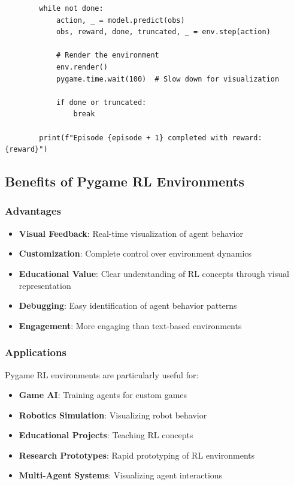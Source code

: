 \documentclass[12pt]{article}
\begin{document}
{{{\begin{verbatim}
        while not done:
            action, _ = model.predict(obs)
            obs, reward, done, truncated, _ = env.step(action)
            
            # Render the environment
            env.render()
            pygame.time.wait(100)  # Slow down for visualization
            
            if done or truncated:
                break
                
        print(f"Episode {episode + 1} completed with reward: {reward}")
\end{verbatim}

\subsection{Benefits of Pygame RL Environments}

\subsubsection{Advantages}

\begin{itemize}
    \item \textbf{Visual Feedback}: Real-time visualization of agent behavior
    \item \textbf{Customization}: Complete control over environment dynamics
    \item \textbf{Educational Value}: Clear understanding of RL concepts through visual representation
    \item \textbf{Debugging}: Easy identification of agent behavior patterns
    \item \textbf{Engagement}: More engaging than text-based environments
\end{itemize}

\subsubsection{Applications}

Pygame RL environments are particularly useful for:

\begin{itemize}
    \item \textbf{Game AI}: Training agents for custom games
    \item \textbf{Robotics Simulation}: Visualizing robot behavior
    \item \textbf{Educational Projects}: Teaching RL concepts
    \item \textbf{Research Prototypes}: Rapid prototyping of RL environments
    \item \textbf{Multi-Agent Systems}: Visualizing agent interactions
\end{itemize}

}}}
\end{document}
